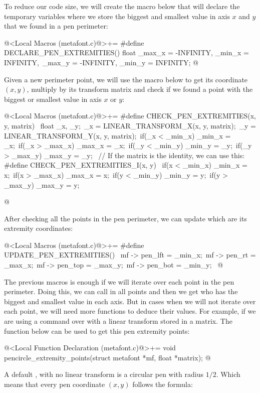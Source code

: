 {{{{{To reduce our code size, we will create the macro below that will
declare the temporary variables where we store the biggest and
smallest value in axis $x$ and $y$ that we found in a pen perimeter:

\iniciocodigo
@<Local Macros (metafont.c)@>+=
#define DECLARE_PEN_EXTREMITIES() float _max_x = -INFINITY, _min_x = INFINITY,\
                                  _max_y = -INFINITY, _min_y = INFINITY;
@
\fimcodigo

Given a new perimeter point, we will use the macro below to get its
coordinate $(x, y)$, multiply by its transform matrix and check if we
found a point with the biggest or smallest value in axis $x$ or $y$:

\iniciocodigo
@<Local Macros (metafont.c)@>+=
#define CHECK_PEN_EXTREMITIES(x, y, matrix) {\
   float _x, _y;\
   _x = LINEAR_TRANSFORM_X(x, y, matrix);\
   _y = LINEAR_TRANSFORM_Y(x, y, matrix);\
   if(_x < _min_x) _min_x = _x;\
   if(_x > _max_x) _max_x = _x;\
   if(_y < _min_y) _min_y = _y;\
   if(_y > _max_y) _max_y = _y;\
  }
// If the matrix is the identity, we can use this:
#define CHECK_PEN_EXTREMITIES_I(x, y) {\
   if(x < _min_x) _min_x = x;\
   if(x > _max_x) _max_x = x;\
   if(y < _min_y) _min_y = y;\
   if(y > _max_y) _max_y = y;\
  }

@
\fimcodigo

After checking all the points in the pen perimeter, we can update
which are its extremity coordinates:

\iniciocodigo
@<Local Macros (metafont.c)@>+=
#define UPDATE_PEN_EXTREMITIES() {\
  mf -> pen_lft = _min_x;\
  mf -> pen_rt = _max_x;\
  mf -> pen_top = _max_y;\
  mf -> pen_bot = _min_y;\
}
@
\fimcodigo

The previous macros is enough if we will iterate over each point in
the pen perimeter. Doing this, we can
call  in all points and then we
get who has the biggest and smallest value in each axis. But in cases
when we will not iterate over each point, we will need more functions
to deduce their values. For example, if we are using
a \monoespaco{pickup} command over  with a
linear transform stored in a matrix. The function below can be used to
get this pen extremity points:

\iniciocodigo
@<Local Function Declaration (metafont.c)@>+=
void pencircle_extremity_points(struct metafont *mf, float *matrix);
@
\fimcodigo

A default , with no linear transform is a
circular pen with radius $1/2$. Which means that every pen coordinate
$(x, y)$ follows the formula:

}}}}}

